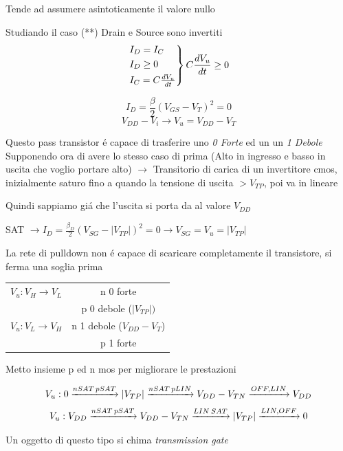 \documentclass{article}
\begin{document}
Tende ad assumere asintoticamente il valore nullo


Studiando il caso (**)
Drain e Source sono invertiti
\[
    \begin{rcases}
    I_D = I_C\\
    I_D \ge 0\\
    I_C = C \frac{dV_u}{dt}
\end{rcases}
C \frac{d V_u}{dt} \ge 0
\]


\[ I_D = \frac{\beta}{2}\left( V_{GS} - V_T\right) ^2 = 0 \]
\[ V_{DD} - V_i \rightarrow V_u = V_{DD} - V_T \]

Questo pass transistor \'e capace di trasferire uno \textit{0 Forte} ed un un \textit{1 Debole}
Supponendo ora di avere lo stesso caso di prima (Alto in ingresso e basso in uscita che voglio portare alto) $\rightarrow$ Transitorio di carica di un invertitore cmos, inizialmente saturo fino a quando la tensione di uscita $> V_{TP} $, poi va in lineare

Quindi sappiamo gi\'a che l'uscita si porta da al valore $V_{DD}$

SAT $\to I_D = \frac{\beta_D}{2}\left(V_{SG} - |V_{TP}|\right)^2 = 0 \rightarrow V_{SG} = V_u = |V_{TP}|$

La rete di pulldown non \'e capace di scaricare completamente il transistore, si ferma una soglia prima

\bigbreak{}
\begin{tabular}{c c}
    $V_u : V_H \to V_L$ & n 0 forte\\
                        & p 0 debole  ($|V_{TP}|)$\\
                        \hline
    $V_u: V_L \to V_H$ & n 1 debole ($V_{DD} - V_T$)\\
                       & p 1 forte\\
\end{tabular}


Metto insieme p ed n mos per migliorare le prestazioni

\[ V_u : 0 \xrightarrow{n SAT\\p SAT} |V_{TP}| \xrightarrow{n SAT\\ p LIN} V_{DD} - V_{TN} \xrightarrow{OFF, LIN} V_{DD} \]
\[ V_u : V_{DD} \xrightarrow{n SAT\\ p SAT} V_{DD} - V_{TN} \xrightarrow{LIN\\SAT} |V_{TP}| \xrightarrow{LIN, OFF} 0 \]

Un oggetto di questo tipo si chima \textit{transmission gate}
\end{document}
